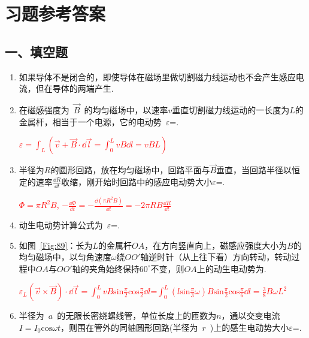 \section{习题参考答案}
\subsection*{一、填空题}
\begin{enumerate}
    \item 如果导体不是闭合的，即使导体在磁场里做切割磁力线运动也不会产生感应电流，但在导体的两端产生.
    \item 在磁感强度为~$\vec{B}$~的均匀磁场中，以速率$v$垂直切割磁力线运动的一长度为$L$的金属杆，相当于一个电源，它的电动势~$\varepsilon$=.
    \begin{note}
        \textcolor{red}{$\varepsilon=\int_L (\vec{v}+\vec{B}\cdot \dd \vec{l}=\int_{0}^{L}vB\dd l = vBL)$}
    \end{note}
    \item 半径为$R$的圆形回路，放在均匀磁场中，回路平面与$\vec{B}$垂直，当回路半径以恒定的速率$\frac{\dd R}{\dd t}$收缩，刚开始时回路中的感应电动势大小$\varepsilon$=.
    \begin{note}
       \textcolor{red}{$\varPhi=\pi R^2 B$, $-\frac{\dd \varPhi }{\dd t}=-\frac{\dd (\pi R^2 B)}{\dd t}=-2\pi RB\frac{\dd R}{\dd t}$}
    \end{note}
    \item 动生电动势计算公式为~$\varepsilon$=.
    \item 如图~\ref{Fig:89}：长为$L$的金属杆$OA$，在方向竖直向上，磁感应强度大小为$B$的均匀磁场中，以匀角速度$\omega$绕$OO'$轴逆时针（从上往下看）方向转动，转动过程中$OA$与$OO'$轴的夹角始终保持$60^\circ$不变，则$OA$上的动生电动势为.
    \begin{note}
        \textcolor{red}{$\varepsilon_L(\vec{v}\times\vec{B})\cdot\dd \vec{l}=\int_0^L vB\mathrm{sin}\frac{\pi}{2}\mathrm{cos}\frac{\pi}{2}\dd l$=$\int_0^L(l\mathrm{sin}\frac{\pi}{3}\omega)B\mathrm{sin}\frac{\pi}{2}\mathrm{cos}\frac{\pi}{6}\dd l=\frac{3}{8}B\omega L^2$}
    \end{note}
    \item 半径为~$a$~的无限长密绕螺线管，单位长度上的匝数为$n$，通以交变电流$I=I_0\mathrm{cos}\omega t$，则围在管外的同轴圆形回路(半径为~$r$~)上的感生电动势大小$\varepsilon$=.

\end{enumerate}
